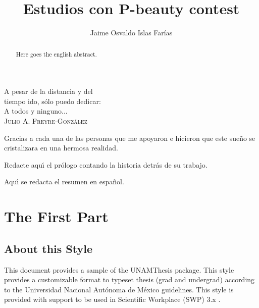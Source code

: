 \documentclass[11pt,spanish]{report}
\begin{document}
\title{Estudios con P-beauty contest}
\author{Jaime Osvaldo Islas Far\'{i}as}
\maketitle

\begin{dedication}
A pesar de la distancia y del\\
tiempo ido, s\'{o}lo puedo dedicar:\\
A todos y ninguno...\\
\textsc{Julio A. Freyre-Gonz\'{a}lez}
\end{dedication}

\begin{acknowledgements}
Gracias a cada una de las personas que me apoyaron e hicieron que
este sue\~{n}o se cristalizara en una hermosa realidad.
\end{acknowledgements}

\tableofcontents
\clearpage

\begin{foreword}
Redacte aqu\'{\i} el pr\'{o}logo contando la historia detr\'{a}s de su
trabajo.
\end{foreword}

\begin{resumen}
Aqu\'{\i} se redacta el resumen en espa\~{n}ol.
\end{resumen}

\begin{abstract}
Here goes the english abstract.
\end{abstract}


\part{The First Part}

\chapter{About this Style}

This document provides a sample of the UNAMThesis package. This style provides a
customizable format to typeset thesis (grad and undergrad) according to the Universidad
Nacional Aut\'{o}noma de M\'{e}xico guidelines. This style is provided with support to be
used in Scientific Workplace (SWP) 3.x \citep{Barabasi2002,Freyre-Gonzalez2008,
Freyre-Gonzalez2005}.
\end{document}
